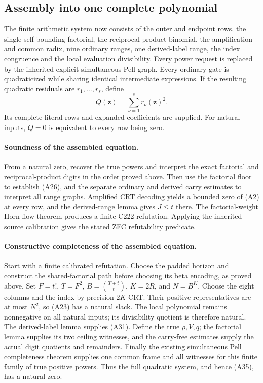 \subsection{Assembly into one complete polynomial}

The finite arithmetic system now consists of the outer and endpoint
rows, the single self-bounding factorial, the reciprocal product
binomial, the amplification and common radix, nine ordinary ranges,
one derived-label range, the index congruence and the local evaluation
divisibility.  Every power request is replaced by the inherited explicit
simultaneous Pell graph.  Every ordinary gate is quadraticized while
sharing identical intermediate expressions.  If the resulting quadratic
residuals are \(r_1,\ldots,r_s\), define
\[
 Q(\mathbf z)=\sum_{\nu=1}^{s}r_\nu(\mathbf z)^2.         \tag{A35}
\]
Its complete literal rows and expanded coefficients are supplied.
For natural inputs, \(Q=0\) is equivalent to every row being zero.

\paragraph{Soundness of the assembled equation.}
From a natural zero, recover the true powers and interpret the exact
factorial and reciprocal-product digits in the order proved above.
Then use the factorial floor to establish (A26), and the separate
ordinary and derived carry estimates to interpret all range graphs.
Amplified CRT decoding yields a bounded zero of (A2) at every row,
and the derived-range lemma gives \(J\le t\) there.
The factorial-weight Horn-flow theorem produces a finite C222
refutation.  Applying the inherited source calibration gives the stated
ZFC refutability predicate.

\paragraph{Constructive completeness of the assembled equation.}
Start with a finite calibrated refutation.  Choose the padded horizon
and construct the shared-factorial path before choosing its beta
encoding, as proved above.  Set \(F=t!\), \(T=F^2\),
\(B=\binom{T+t}{t}\), \(K=2R\), and \(N=B^K\).
Choose the eight columns and the index by precision-\(2K\) CRT.
Their positive representatives are at most \(N^2\), so (A23) has a
natural slack.  The local polynomial remains nonnegative on all
natural inputs; its divisibility quotient is therefore natural.
The derived-label lemma supplies (A31).
Define the true \(\rho,V,q\); the factorial lemma supplies its two
ceiling witnesses, and the carry-free estimates supply the actual
digit quotients and remainders.  Finally the existing simultaneous
Pell completeness theorem supplies one common frame and all witnesses
for this finite family of true positive powers.  Thus the full
quadratic system, and hence (A35), has a natural zero.

